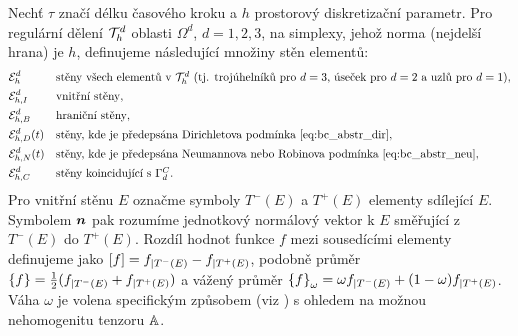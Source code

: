 Nechť $\tau$ značí délku časového kroku a $h$ prostorový diskretizační parametr.
Pro regulární dělení $\mathcal T_h^d$ oblasti $\Omega^d$, $d=1,2,3$, na simplexy, jehož norma (nejdelší hrana) je $h$, definujeme následující množiny stěn elementů:
\begin{align*}
&\mathcal E_h^d &&\mbox{stěny všech elementů v $\mathcal T_h^d$ (tj. trojúhelníků pro $d=3$, úseček pro $d=2$ a uzlů pro $d=1$)},\\
&\mathcal E_{h,I}^d &&\mbox{vnitřní stěny},\\
&\mathcal E_{h,B}^d &&\mbox{hraniční stěny},\\
&\mathcal E_{h,D}^d(t) &&\mbox{stěny, kde je předepsána Dirichletova podmínka \eqref{eq:bc_abstr_dir}},\\
&\mathcal E_{h,N}^d(t) &&\mbox{stěny, kde je předepsána Neumannova nebo Robinova podmínka  \eqref{eq:bc_abstr_neu}},\\
&\mathcal E_{h,C}^d &&\mbox{stěny koincidující s $\Gamma^C_d$}.
\end{align*}
Pro vnitřní stěnu $E$ označme symboly $T^-(E)$ a $T^+(E)$ elementy sdílející $E$.
Symbolem $\mathbf{\boldsymbol{n}}$ pak rozumíme jednotkový normálový vektor k $E$ směřující z $T^-(E)$ do $T^+(E)$.
Rozdíl hodnot funkce $f$ mezi sousedícími elementy definujeme jako $[f]=f_{|T^-(E)}-f_{|T^+(E)}$, podobně průměr $\left\{f\right\}=\frac12(f_{|T^-(E)} + f_{|T^+(E)})$ a vážený průměr $\left\{f\right\}_\omega=\omega f_{|T^-(E)} + (1-\omega) f_{|T^+(E)}$.
Váha $\omega$ je volena specifickým způsobem (viz \cite{ern_stephansen_zunino}) s ohledem na možnou nehomogenitu tenzoru ${\mathbb{A}}$.

